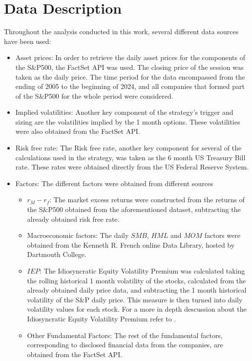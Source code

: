 \section{Data Description}
\label{sec:data-description}
Throughout the analysis conducted in this work, several different data sources have been used:
\begin{itemize}
    \item Asset prices: In order to retrieve the daily asset prices for the components of the S\&P500, the FactSet API was used. The closing price of the session was taken as the daily price. The time period for the data encompassed from the ending of 2005 to the beginning of 2024, and all companies that formed part of the S\&P500 for the whole period were considered. 
    \item Implied volatilities: Another key component of the strategy's trigger and sizing are the volatilities implied by the 1 month options. These volatilities were also obtained from the FactSet API. 
    \item Risk free rate: The Risk free rate, another key component for several of the calculations used in the strategy, was taken as the 6 month US Treasury Bill rate. These rates were obtained directly from the US Federal Reserve System.
    \item Factors: The different factors were obtained from different sources
    \begin{itemize}
        \item $r_M-r_f$: The market excess returns were constructed from the returns of the S\&P500 obtained from the aforementioned dataset, subtracting the already obtained risk free rate.
        \item Macroeconomic factors: The daily $SMB$, $HML$ and $MOM$ factors were obtained from the Kenneth R. French online Data Library, hosted by Dartmouth College.
        \item $IEP$: The Idiosyncratic Equity Volatility Premium was calculated taking the rolling historical 1 month volatility of the stocks, calculated from the already obtained daily price data, and subtracting the 1 month historical volatility of the S\&P daily price. This measure is then turned into daily volatility values for each stock. For a more in depth descussion about the Idiosyncratic Equity Volatility Premium refer to \cite{ioannis_2024}.
        \item Other Fundamental Factors: The rest of the fundamental factors, corresponding to disclosed financial data from the companies, are obtained from the FactSet API. 
    \end{itemize}
\end{itemize}